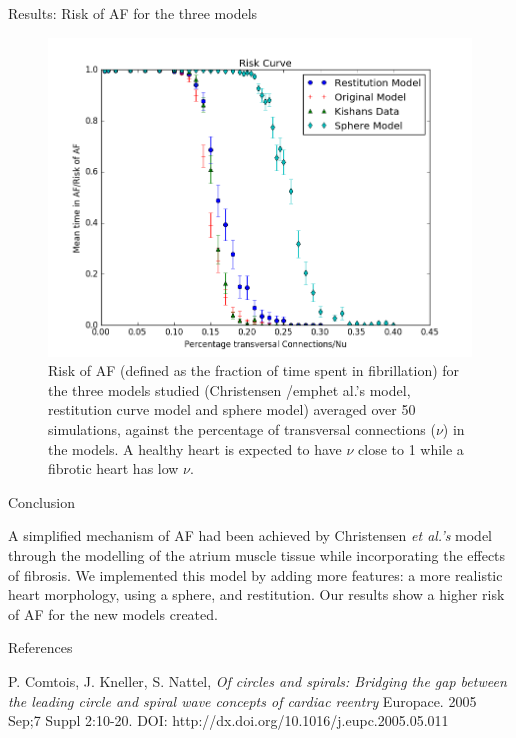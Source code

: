 \documentclass[final,hyperref={pdfpagelabels=false}]{beamer}
\begin{document}
\begin{frame}[t]
\begin{columns}[t]
\begin{column}{.465\textwidth}
\begin{block}{Results: Risk of AF for the three models}
\begin{figure}
\includegraphics[width=0.65\linewidth]{xriskcurvesphere}
\caption{Risk of AF (defined as the fraction of time spent in fibrillation) for the three models studied (Christensen /emph{et al.}'s model, restitution curve model and sphere model) averaged over 50 simulations, against the percentage of transversal connections ($\nu$) in the models. A healthy heart is expected to have $\nu$ close to 1 while a fibrotic heart has low $\nu$.}
\end{figure}

\end{block}


\begin{block}{Conclusion}

A simplified mechanism of AF had been achieved by Christensen \emph{et al.'s} model through the modelling of the atrium muscle tissue while incorporating the effects of fibrosis. We implemented this model by adding more features: a more realistic heart morphology, using a sphere, and restitution. Our results show a higher risk of AF for the new models created.

\end{block}


\begin{block}{References}
\begin{thebibliography}{1}

P. Comtois, J. Kneller, S. Nattel,
\emph{Of circles and spirals: Bridging the gap between the leading circle and spiral wave concepts of cardiac reentry}
Europace. 2005 Sep;7 Suppl 2:10-20.
DOI: http://dx.doi.org/10.1016/j.eupc.2005.05.011




\end{thebibliography}
\end{block}
\end{column}
\end{columns}
\end{frame}
\end{document}
